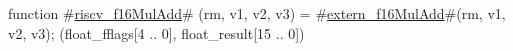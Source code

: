 function #\hyperref[sailRISCVzriscvzyf16MulAdd]{riscv\_f16MulAdd}# (rm, v1, v2, v3) = {
  #\hyperref[sailRISCVzexternzyf16MulAdd]{extern\_f16MulAdd}#(rm, v1, v2, v3);
  (float_fflags[4 .. 0], float_result[15 .. 0])
}
